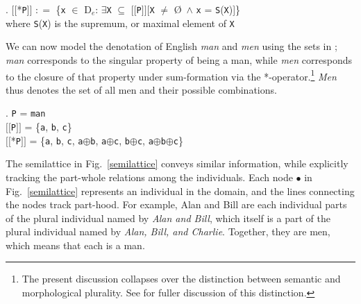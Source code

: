 \documentclass[linguex]{sp}
\newcommand{\sem}[1]{\mbox{$[\![$#1$]\!]$}}
\newcommand{\defeq}{$\mathrel{\mathop:}=$ }
\renewcommand{\and}{$\wedge$ }
\begin{document}
\ex. \sem{*\texttt{P}} \defeq \{\texttt{x} $\in$ D$_{e}$: $\exists$\texttt{X} $\subseteq$ \sem{\texttt{P}}[\texttt{X} $\neq$ \O\ \and \texttt{x} = \texttt{S}(\texttt{X})]\}\\
where \texttt{S}(\texttt{X}) is the supremum, or maximal element of \texttt{X}

We can now model the denotation of English \emph{man} and \emph{men} using the sets in \Next; \emph{man} corresponds to the singular property of being a man, while \emph{men} corresponds to the closure of that property under sum-formation via the *-operator.\footnote{The present discussion collapses over the distinction between semantic and morphological plurality. See \cite{scontras2013salt,scontras2013sub,scontras2014diss} for fuller discussion of this distinction.} \emph{Men} thus denotes the set of all men and their possible combinations.

\ex. \texttt{P} = \texttt{man}\\
\sem{\texttt{P}} = \{\texttt{a}, \texttt{b}, \texttt{c}\}\\
\sem{*\texttt{P}} = \{\texttt{a}, \texttt{b}, \texttt{c}, \texttt{a}$\oplus$\texttt{b}, \texttt{a}$\oplus$\texttt{c}, \texttt{b}$\oplus$\texttt{c}, \texttt{a}$\oplus$\texttt{b}$\oplus$\texttt{c}\}

The semilattice in Fig.\ \ref{semilattice} conveys similar information, while explicitly tracking the part-whole relations among the individuals.
Each node $\bullet$ in Fig.\ \ref{semilattice} represents an individual in the domain, and the lines connecting the nodes track part-hood. For example, Alan and Bill are each individual parts of the plural individual named by \emph{Alan and Bill}, which itself is a part of the plural individual named by \emph{Alan, Bill, and Charlie}. Together, they are men, which means that each is a man.
\end{document}
